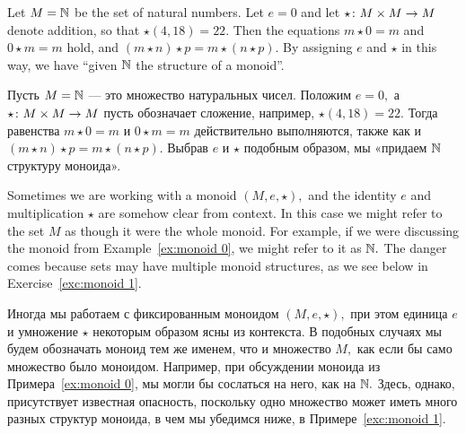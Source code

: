 \documentclass[CT4S-EN-RU]{subfiles}
\begin{document}
\begin{exampleENG}\label{ex:monoid 0}
Let $M={\mathbb N}$ be the set of natural numbers. Let $e=0$ and let $\star\colon M\times M\rightarrow M$ denote addition, so that $\star(4,18)=22.$ Then the equations $m\star 0=m$ and $0\star m=m$ hold, and $(m\star n)\star p=m\star (n\star p).$ By assigning $e$ and $\star$ in this way, we have “given ${\mathbb N}$ the structure of a monoid”.
\end{exampleENG}

\begin{exampleRUS}\label{ex:monoid 0}
Пусть $M={\mathbb N}$ — это множество натуральных чисел. Положим $e=0,$ а $\star\colon M\times M\rightarrow M$ пусть обозначает сложение, например, $\star(4,18)=22.$ Тогда равенства $m\star 0=m$ и $0\star m=m$ действительно выполняются, также как и $(m\star n)\star p=m\star (n\star p).$ Выбрав $e$ и $\star$ подобным образом, мы «придаем ${\mathbb N}$ структуру моноида».
\end{exampleRUS}

\begin{remarkENG}
Sometimes we are working with a monoid $(M,e,\star),$ and the identity $e$ and multiplication $\star$ are somehow clear from context. In this case we might refer to the set $M$ as though it were the whole monoid. For example, if we were discussing the monoid from Example~\ref{ex:monoid 0}, we might refer to it as ${\mathbb N}.$ The danger comes because sets may have multiple monoid structures, as we see below in Exercise~\ref{exc:monoid 1}.
\end{remarkENG}

\begin{remarkRUS}
Иногда мы работаем с фиксированным моноидом $(M,e,\star),$ при этом единица $e$ и умножение $\star$ некоторым образом ясны из контекста. В подобных случаях мы будем обозначать моноид тем же именем, что и множество $M,$ как если бы само множество было моноидом. Например, при обсуждении моноида из Примера~\ref{ex:monoid 0}, мы могли бы сослаться на него, как на ${\mathbb N}.$ Здесь, однако, присутствует известная опасность, поскольку одно множество может иметь много разных структур моноида, в чем мы убедимся ниже, в Примере~\ref{exc:monoid 1}.
\end{remarkRUS}
\end{document}
